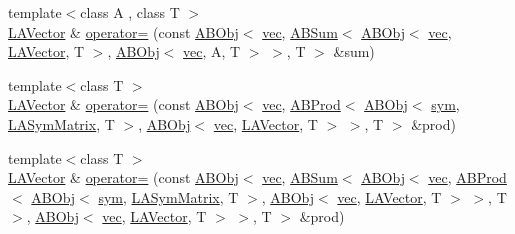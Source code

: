 \begin{DoxyCompactItemize}
\item 
{\footnotesize template$<$class A , class T $>$ }\\\mbox{\hyperlink{classROOT_1_1Minuit2_1_1LAVector}{L\+A\+Vector}} \& \mbox{\hyperlink{classROOT_1_1Minuit2_1_1LAVector_aa0b9243a861edc8aec8b958287fbb804}{operator=}} (const \mbox{\hyperlink{classROOT_1_1Minuit2_1_1ABObj}{A\+B\+Obj}}$<$ \mbox{\hyperlink{classROOT_1_1Minuit2_1_1vec}{vec}}, \mbox{\hyperlink{classROOT_1_1Minuit2_1_1ABSum}{A\+B\+Sum}}$<$ \mbox{\hyperlink{classROOT_1_1Minuit2_1_1ABObj}{A\+B\+Obj}}$<$ \mbox{\hyperlink{classROOT_1_1Minuit2_1_1vec}{vec}}, \mbox{\hyperlink{classROOT_1_1Minuit2_1_1LAVector}{L\+A\+Vector}}, T $>$, \mbox{\hyperlink{classROOT_1_1Minuit2_1_1ABObj}{A\+B\+Obj}}$<$ \mbox{\hyperlink{classROOT_1_1Minuit2_1_1vec}{vec}}, A, T $>$ $>$, T $>$ \&sum)
\item 
{\footnotesize template$<$class T $>$ }\\\mbox{\hyperlink{classROOT_1_1Minuit2_1_1LAVector}{L\+A\+Vector}} \& \mbox{\hyperlink{classROOT_1_1Minuit2_1_1LAVector_a100191791ee9f4884469efa6d779f6ec}{operator=}} (const \mbox{\hyperlink{classROOT_1_1Minuit2_1_1ABObj}{A\+B\+Obj}}$<$ \mbox{\hyperlink{classROOT_1_1Minuit2_1_1vec}{vec}}, \mbox{\hyperlink{classROOT_1_1Minuit2_1_1ABProd}{A\+B\+Prod}}$<$ \mbox{\hyperlink{classROOT_1_1Minuit2_1_1ABObj}{A\+B\+Obj}}$<$ \mbox{\hyperlink{classROOT_1_1Minuit2_1_1sym}{sym}}, \mbox{\hyperlink{classROOT_1_1Minuit2_1_1LASymMatrix}{L\+A\+Sym\+Matrix}}, T $>$, \mbox{\hyperlink{classROOT_1_1Minuit2_1_1ABObj}{A\+B\+Obj}}$<$ \mbox{\hyperlink{classROOT_1_1Minuit2_1_1vec}{vec}}, \mbox{\hyperlink{classROOT_1_1Minuit2_1_1LAVector}{L\+A\+Vector}}, T $>$ $>$, T $>$ \&prod)
\item 
{\footnotesize template$<$class T $>$ }\\\mbox{\hyperlink{classROOT_1_1Minuit2_1_1LAVector}{L\+A\+Vector}} \& \mbox{\hyperlink{classROOT_1_1Minuit2_1_1LAVector_a7292b95daebb260c1b3c7c356bf72268}{operator=}} (const \mbox{\hyperlink{classROOT_1_1Minuit2_1_1ABObj}{A\+B\+Obj}}$<$ \mbox{\hyperlink{classROOT_1_1Minuit2_1_1vec}{vec}}, \mbox{\hyperlink{classROOT_1_1Minuit2_1_1ABSum}{A\+B\+Sum}}$<$ \mbox{\hyperlink{classROOT_1_1Minuit2_1_1ABObj}{A\+B\+Obj}}$<$ \mbox{\hyperlink{classROOT_1_1Minuit2_1_1vec}{vec}}, \mbox{\hyperlink{classROOT_1_1Minuit2_1_1ABProd}{A\+B\+Prod}}$<$ \mbox{\hyperlink{classROOT_1_1Minuit2_1_1ABObj}{A\+B\+Obj}}$<$ \mbox{\hyperlink{classROOT_1_1Minuit2_1_1sym}{sym}}, \mbox{\hyperlink{classROOT_1_1Minuit2_1_1LASymMatrix}{L\+A\+Sym\+Matrix}}, T $>$, \mbox{\hyperlink{classROOT_1_1Minuit2_1_1ABObj}{A\+B\+Obj}}$<$ \mbox{\hyperlink{classROOT_1_1Minuit2_1_1vec}{vec}}, \mbox{\hyperlink{classROOT_1_1Minuit2_1_1LAVector}{L\+A\+Vector}}, T $>$ $>$, T $>$, \mbox{\hyperlink{classROOT_1_1Minuit2_1_1ABObj}{A\+B\+Obj}}$<$ \mbox{\hyperlink{classROOT_1_1Minuit2_1_1vec}{vec}}, \mbox{\hyperlink{classROOT_1_1Minuit2_1_1LAVector}{L\+A\+Vector}}, T $>$ $>$, T $>$ \&prod)
\end{DoxyCompactItemize}


